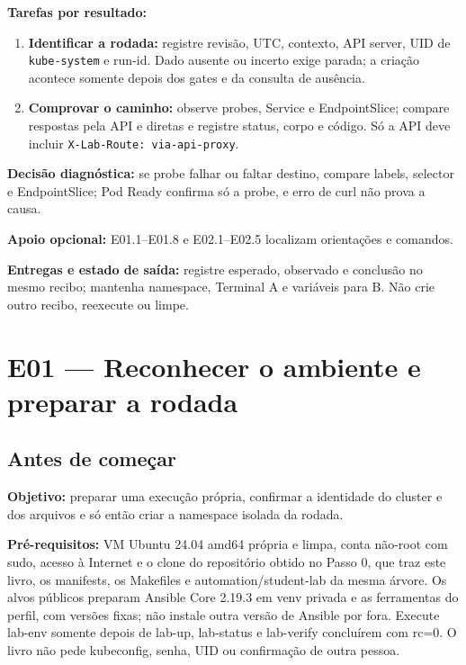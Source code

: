 \documentclass[12pt,openany,oneside,a4paper,chapter=TITLE,english,brazil]{abntex2}
\providecommand{\tightlist}{\setlength{\itemsep}{0pt}\setlength{\parskip}{0pt}}
\begin{document}
\textbf{Tarefas por resultado:}

\begin{enumerate}
\def\labelenumi{\arabic{enumi}.}
\tightlist
\item
  \textbf{Identificar a rodada:} registre revisão, UTC, contexto, API server, UID de \texttt{kube-{}\allowbreak{}system} e run-id. Dado ausente ou incerto exige parada; a criação acontece somente depois dos gates e da consulta de ausência.
\item
  \textbf{Comprovar o caminho:} observe probes, Service e EndpointSlice; compare respostas pela API e diretas e registre status, corpo e código. Só a API deve incluir \texttt{X-{}\allowbreak{}Lab-{}\allowbreak{}Route:\allowbreak{} via-{}\allowbreak{}api-{}\allowbreak{}proxy}.
\end{enumerate}

\textbf{Decisão diagnóstica:} se probe falhar ou faltar destino, compare labels, selector e EndpointSlice; Pod Ready confirma só a probe, e erro de curl não prova a causa.

\textbf{Apoio opcional:} E01.1--E01.8 e E02.1--E02.5 localizam orientações e comandos.

\textbf{Entregas e estado de saída:} registre esperado, observado e conclusão no mesmo recibo; mantenha namespace, Terminal A e variáveis para B. Não crie outro recibo, reexecute ou limpe.

\chapter*{E01 — Reconhecer o ambiente e preparar a rodada}

\section*{Antes de começar}\label{antes-de-comeuxe7ar}

\textbf{Objetivo:} preparar uma execução própria, confirmar a identidade do cluster e dos arquivos e só então criar a namespace isolada da rodada.

\textbf{Pré-requisitos:} VM Ubuntu 24.04 amd64 própria e limpa, conta não-root com sudo, acesso à Internet e o clone do repositório obtido no Passo 0, que traz este livro, os manifests, os Makefiles e automation/student-lab da mesma árvore. Os alvos públicos preparam Ansible Core 2.19.3 em venv privada e as ferramentas do perfil, com versões fixas; não instale outra versão de Ansible por fora. Execute lab-env somente depois de lab-up, lab-status e lab-verify concluírem com rc=0. O livro não pede kubeconfig, senha, UID ou confirmação de outra pessoa.
\end{document}
